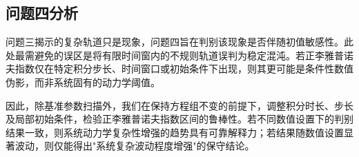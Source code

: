 \subsection{问题四分析}
问题三揭示的复杂轨道只是现象，问题四旨在判别该现象是否伴随初值敏感性。此处最需避免的误区是将有限时间窗内的不规则轨道误判为稳定混沌。若正李雅普诺夫指数仅在特定积分步长、时间窗口或初始条件下出现，则其更可能是条件性数值伪影，而非系统固有的动力学阈值。

因此，除基准参数扫描外，我们在保持方程组不变的前提下，调整积分时长、步长及局部初始条件，检验正李雅普诺夫指数区间的鲁棒性。若不同数值设置下的判别结果一致，则系统动力学复杂性增强的趋势具有可靠解释力；若结果随数值设置显著波动，则仅能得出"系统复杂波动程度增强"的保守结论。

